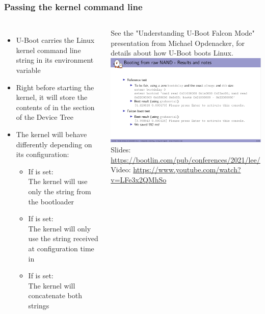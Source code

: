 \begin{frame}
  \frametitle{Passing the kernel command line}
  \begin{columns}
    \begin{itemize}
    \item U-Boot carries the Linux kernel command line string in its
       environment variable
    \item Right before starting the kernel, it will store the contents of
       in the  section of the Device Tree
    \item The kernel will behave differently depending on its
      configuration:
      \begin{itemize}
      \item If  is set:\\
        The kernel will use only the string from the bootloader
      \item If  is set:\\
        The kernel will only use the string received at configuration
        time in 
      \item If  is set:\\
        The kernel will concatenate both strings
      \end{itemize}
    \end{itemize}
    \tiny See the "Understanding U-Boot Falcon Mode"
    presentation from Michael Opdenacker, for details about how U-Boot
    boots Linux.\\
    \vspace{0.6cm}
    \includegraphics[width=\textwidth]{slides/linux-kernel-intro-booting/understanding-falcon-mode-presentation.png}\\
    \vspace{0.4cm}
    \tiny Slides: \url{https://bootlin.com/pub/conferences/2021/lee/}\\
    Video: \url{https://www.youtube.com/watch?v=LFe3x2QMhSo}
  \end{columns}
\end{frame}

